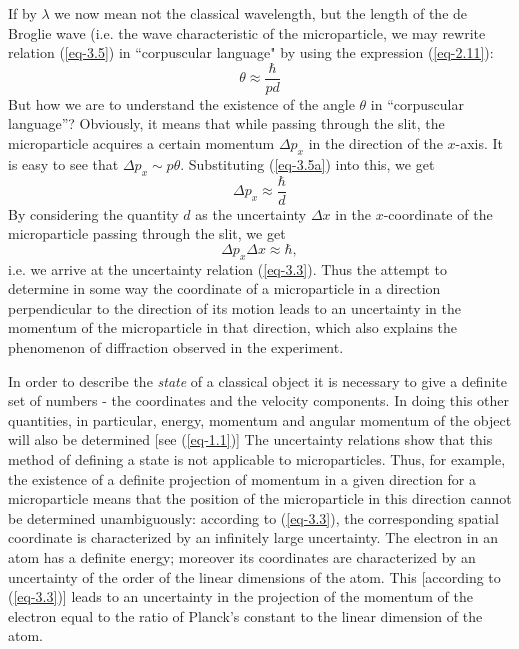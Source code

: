 \documentclass[a4paper,sfsidenotes,colorlinks=true]{tufte-book}
\numberwithin{equation}{section}
\numberwithin{figure}{section}
\begin{document}
If by $\lambda$ we now mean not the classical wavelength, but the length of the
de Broglie wave (i.e. the wave characteristic of the microparticle, we may
rewrite relation (\ref{eq-3.5}) in ``corpuscular language" by using the
expression (\ref{eq-2.11}): 
\begin{equation}%
\theta \approx  \frac{\hbar}{pd} 
\tag{3.5a}
\label{eq-3.5a}
\end{equation}
But how we are to understand the existence of the angle $\theta$ in
``corpuscular language''?  Obviously, it means that while passing
through the slit, the microparticle acquires a certain momentum
$\Delta p_{x}$ in the direction of the $x$-axis. It is easy to see that
$\Delta p_{x}\sim p \theta$. Substituting (\ref{eq-3.5a}) into this,
we get 
\begin{equation*}
\Delta p_{x} \approx  \frac{\hbar}{d} 
\end{equation*}
By considering the quantity $d$ as the uncertainty $\Delta x$ in the
$x$-coordinate of the microparticle passing through the slit, we get
\begin{equation*}
\Delta p_{x}\Delta x \approx \hbar, 
\end{equation*}
i.e. we arrive at the uncertainty relation (\ref{eq-3.3}). Thus the
attempt to determine in some way the coordinate of a microparticle in
a direction perpendicular to the direction of its motion leads to an
uncertainty in the momentum of the microparticle in that direction,
which also explains the phenomenon of diffraction observed in the
experiment.

In order to describe the \emph{state} of a classical object it is
necessary to give a definite set of numbers - the coordinates and the
velocity components. In doing this other quantities, in particular,
energy, momentum and angular momentum of the object will also be
determined [see (\ref{eq-1.1})] The uncertainty relations show that
  this method of defining a state is not applicable to
  microparticles. Thus, for example, the existence of a definite
  projection of momentum in a given direction for a microparticle
  means that the position of the microparticle in this direction
  cannot be determined unambiguously: according to (\ref{eq-3.3}), the
  corresponding spatial coordinate is characterized by an infinitely
  large uncertainty. The electron in an atom has a definite energy;
  moreover its coordinates are characterized by an uncertainty of the
  order of the linear dimensions of the atom. This [according to
  (\ref{eq-3.3})] leads to an uncertainty in the projection of the momentum of
  the electron equal to the ratio of Planck's constant to the linear
  dimension of the atom.
\end{document}
